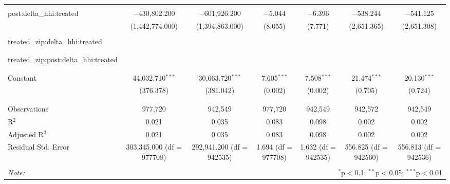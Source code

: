 \begin{table}[H]
{\begin{tabular}{@{\extracolsep{5pt}}lcccccc}
   & & & & & & \\  

  post:delta\_hhi:treated & $-$430,802.200 & $-$601,926.200 & $-$5.044 & $-$6.396 & $-$538.244 & $-$541.125 \\  

   & (1,442,774.000) & (1,394,863.000) & (8.055) & (7.771) & (2,651.365) & (2,651.308) \\  

   & & & & & & \\  

  treated\_zip:delta\_hhi:treated &  &  &  &  &  &  \\  

   &  &  &  &  &  &  \\  

   & & & & & & \\  

  treated\_zip:post:delta\_hhi:treated &  &  &  &  &  &  \\  

   &  &  &  &  &  &  \\  

   & & & & & & \\  

  Constant & 44,032.710$^{***}$ & 30,663.720$^{***}$ & 7.605$^{***}$ & 7.508$^{***}$ & 21.474$^{***}$ & 20.130$^{***}$ \\  

   & (376.378) & (381.042) & (0.002) & (0.002) & (0.705) & (0.724) \\  

   & & & & & & \\  

 \hline \\[-1.8ex]  

 Observations & 977,720 & 942,549 & 977,720 & 942,549 & 942,572 & 942,549 \\  

 R$^{2}$ & 0.021 & 0.035 & 0.083 & 0.098 & 0.002 & 0.002 \\  

 Adjusted R$^{2}$ & 0.021 & 0.035 & 0.083 & 0.098 & 0.002 & 0.002 \\  

 Residual Std. Error & 303,345.000 (df = 977708) & 292,941.200 (df = 942535) & 1.694 (df = 977708) & 1.632 (df = 942535) & 556.825 (df = 942560) & 556.813 (df = 942536) \\  

 \hline  

 \hline \\[-1.8ex]  

 \textit{Note:}  & \multicolumn{6}{r}{$^{*}$p$<$0.1; $^{**}$p$<$0.05; $^{***}$p$<$0.01} \\  

 \end{tabular}}  

 \end{table}  

